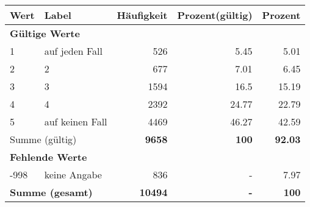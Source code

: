      \begin{longtable}{lXrrr}
     \toprule
     \textbf{Wert} & \textbf{Label} & \textbf{Häufigkeit} & \textbf{Prozent(gültig)} & \textbf{Prozent} \\
     \endhead
     \midrule
     \multicolumn{5}{l}{\textbf{Gültige Werte}}\\

     1 &
     \multicolumn{1}{X}{ auf jeden Fall   } &


       \num{526} &
       \num[round-mode=places,round-precision=2]{5.45} &
         \num[round-mode=places,round-precision=2]{5.01} \\

     2 &
     \multicolumn{1}{X}{ 2   } &


       \num{677} &
       \num[round-mode=places,round-precision=2]{7.01} &
         \num[round-mode=places,round-precision=2]{6.45} \\

     3 &
     \multicolumn{1}{X}{ 3   } &


       \num{1594} &
       \num[round-mode=places,round-precision=2]{16.5} &
         \num[round-mode=places,round-precision=2]{15.19} \\

     4 &
     \multicolumn{1}{X}{ 4   } &


       \num{2392} &
       \num[round-mode=places,round-precision=2]{24.77} &
         \num[round-mode=places,round-precision=2]{22.79} \\

     5 &
     \multicolumn{1}{X}{ auf keinen Fall   } &


       \num{4469} &
       \num[round-mode=places,round-precision=2]{46.27} &
         \num[round-mode=places,round-precision=2]{42.59} \\
     \midrule
     \multicolumn{2}{l}{Summe (gültig)} &
       \textbf{\num{9658}} &
     \textbf{\num{100}} &
       \textbf{\num[round-mode=places,round-precision=2]{92.03}} \\
     \multicolumn{5}{l}{\textbf{Fehlende Werte}}\\
       -998 &
       keine Angabe &
         \num{836} &
        - &
         \num[round-mode=places,round-precision=2]{7.97} \\
     \midrule
     \multicolumn{2}{l}{\textbf{Summe (gesamt)}} &
          \textbf{\num{10494}} &
        \textbf{-} &
        \textbf{\num{100}} \\
     \bottomrule
     \end{longtable}
     
